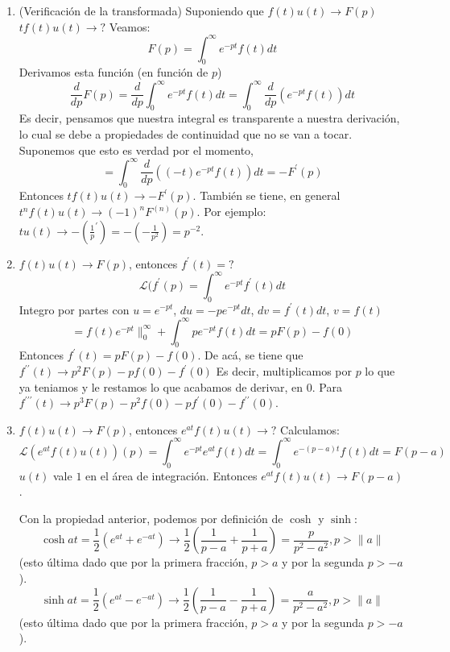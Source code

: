 \begin{enumerate}

\item (Verificaci\'on de la transformada) Suponiendo que $f(t)u(t) \longrightarrow F(p)$ %
$tf(t)u(t) \longrightarrow ?$ %
Veamos:
$$
F(p)= \int_0^{\infty}e^{-pt}f(t)dt
$$
Derivamos esta funci\'on (en funci\'on de $p$)
$$
\frac{d}{dp}F(p) = \frac{d}{dp}\int_0^{\infty}e^{-pt}f(t)dt = \int_0^{\infty}\frac{d}{dp}(e^{-pt}f(t))dt
$$
Es decir, pensamos que nuestra integral es transparente a nuestra derivaci\'on, lo cual se debe a propiedades de continuidad que no se van a tocar. Suponemos que esto es verdad por el momento,
$$
= \int_0^{\infty}\frac{d}{dp}((-t) e^{-pt}f(t))dt = -F^{\prime}(p)
$$
Entonces $tf(t)u(t) \longrightarrow -F^{\prime}(p)$. %
Tambi\'en se tiene, en general %
$t^n f(t)u(t) \longrightarrow (-1)^n F^{(n)}(p)$.
Por ejemplo: $tu(t) \longrightarrow -(\frac{1}{p}^{\prime}) = -(-\frac{1}{p^2}) = p^{-2}$.

\item $f(t)u(t) \longrightarrow F(p)$, entonces $f^{\prime}(t) = ?$
$$
\mathcal{L}(f^{\prime}(p) = \int_0^{\infty}e^{-pt}f^{\prime}(t)dt
$$%
Integro por partes con $u = e^{-pt}$, $du = -p e^{-pt}dt$, $dv = f^{\prime}(t)dt$, $v = f(t)$
$$
=f(t)e^{-pt}\|^{\infty}_0 + \int_0^{\infty}pe^{-pt}f(t)dt = pF(p) - f(0)
$$
Entonces $f^{\prime}(t) = pF(p) - f(0)$. De ac\'a, se tiene que $f^{\prime\prime}(t) \longrightarrow p^2F(p)-pf(0)-f^{\prime}(0)$ %
Es decir, multiplicamos por $p$ lo que ya teniamos y le restamos lo que acabamos de derivar, en $0$. Para $f^{\prime\prime\prime}(t) \longrightarrow p^3F(p)-p^2f(0) - pf^{\prime}(0) -f^{\prime\prime}(0)$.

\item $f(t)u(t) \longrightarrow F(p)$, entonces $e^{at}f(t)u(t) \longrightarrow ?$ %
Calculamos:
$$
\mathcal{L}(e^{at}f(t)u(t))(p) =\int_0^{\infty}e^{-pt}e^{at}f(t)dt = \int_0^{\infty}e^{-(p-a)t}f(t)dt = F(p-a)
$$
$u(t)$ vale $1$ en el \'area de integraci\'on. Entonces $e^{at}f(t)u(t) \longrightarrow F(p-a)$.

Con la propiedad anterior, podemos por definici\'on de $\cosh$ y $\sinh$:
$$
\cosh{at} = \frac{1}{2}(e^{at} + e^{-at}) \longrightarrow \frac{1}{2}(\frac{1}{p-a} + \frac{1}{p+a}) = \frac{p}{p^2-a^2},p>\|a\|
$$ (esto \'ultima dado que por la primera fracci\'on, $p > a$ y por la segunda $p > -a$). %
$$
\sinh{at} = \frac{1}{2}(e^{at} - e^{-at}) \longrightarrow \frac{1}{2}(\frac{1}{p-a} - \frac{1}{p+a}) = \frac{a}{p^2-a^2},p>\|a\|
$$ (esto \'ultima dado que por la primera fracci\'on, $p > a$ y por la segunda $p > -a$). %


\end{enumerate}

